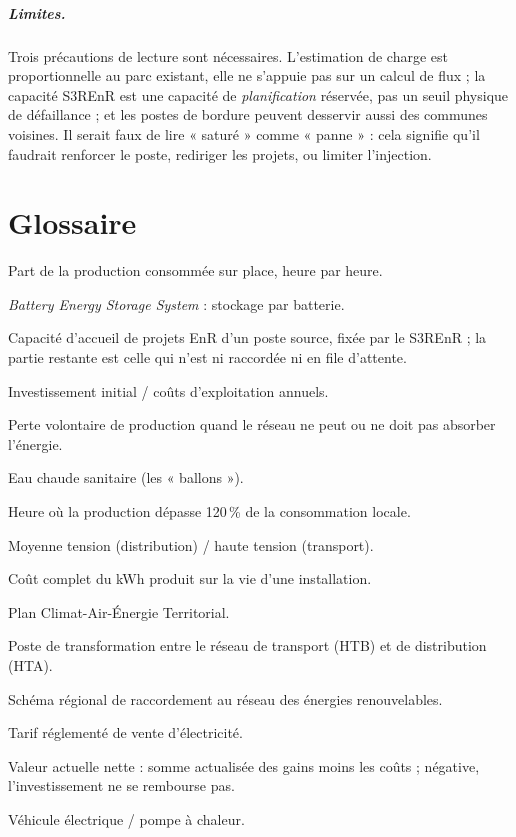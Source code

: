 \documentclass[11pt, a4paper]{report}
\newcommand{\pct}{\,\%}
\begin{document}
\paragraph{Limites.} Trois précautions de lecture sont nécessaires. L'estimation de charge est proportionnelle au parc existant, elle ne s'appuie pas sur un calcul de flux ; la capacité S3REnR est une capacité de \emph{planification} réservée, pas un seuil physique de défaillance ; et les postes de bordure peuvent desservir aussi des communes voisines. Il serait faux de lire « saturé » comme « panne » : cela signifie qu'il faudrait renforcer le poste, rediriger les projets, ou limiter l'injection.

\appendix
\chapter{Glossaire}

\begin{description}[leftmargin=3.2cm, style=nextline]
  \item[Autoconsommation] Part de la production consommée sur place, heure par heure.
  \item[BESS] \emph{Battery Energy Storage System} : stockage par batterie.
  \item[Capacité réservée / restante] Capacité d'accueil de projets EnR d'un poste source, fixée par le S3REnR ; la partie restante est celle qui n'est ni raccordée ni en file d'attente.
  \item[CAPEX / OPEX] Investissement initial / coûts d'exploitation annuels.
  \item[Écrêtement] Perte volontaire de production quand le réseau ne peut ou ne doit pas absorber l'énergie.
  \item[ECS] Eau chaude sanitaire (les « ballons »).
  \item[Heure de vigilance] Heure où la production dépasse 120\pct{} de la consommation locale.
  \item[HTA / HTB] Moyenne tension (distribution) / haute tension (transport).
  \item[LCOE] Coût complet du kWh produit sur la vie d'une installation.
  \item[PCAET] Plan Climat-Air-Énergie Territorial.
  \item[Poste source] Poste de transformation entre le réseau de transport (HTB) et de distribution (HTA).
  \item[S3REnR] Schéma régional de raccordement au réseau des énergies renouvelables.
  \item[TRVE] Tarif réglementé de vente d'électricité.
  \item[VAN] Valeur actuelle nette : somme actualisée des gains moins les coûts ; négative, l'investissement ne se rembourse pas.
  \item[VE / PAC] Véhicule électrique / pompe à chaleur.
\end{description}
\end{document}
